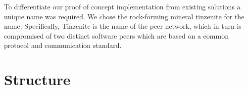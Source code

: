 To differentiate our proof of concept implementation from existing solutions a unique name was required.
We chose the rock-forming mineral tinzenite for the name.
Specifically, Tinzenite is the name of the peer network, which in turn is compromised of two distinct software peers which are based on a common protocol and communication standard.

\section{Structure}
\label{sec:Structure}
